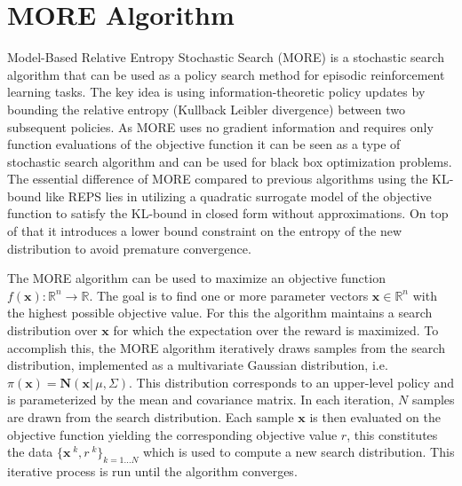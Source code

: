 \section{MORE Algorithm}
\label{sec:more}
Model-Based Relative Entropy Stochastic Search
(MORE) \citep{abdolmaleki2015model} is a
stochastic search algorithm that can be used
as a policy search method for episodic reinforcement
learning tasks. The key idea is
using information-theoretic policy updates
by bounding the relative entropy (Kullback Leibler divergence)
between two subsequent policies.
As MORE uses no gradient information and requires only function evaluations
of the objective function it can be seen as
a type of stochastic search algorithm and can be used
for black box optimization problems.
The essential difference of MORE compared to previous algorithms using
the KL-bound like REPS \citep{peters2010relative} lies in utilizing
a quadratic surrogate model of the objective function
to  satisfy the KL-bound in closed form without approximations.
On top of that it
introduces a lower bound constraint on the entropy of the new distribution
to avoid premature convergence.

The MORE algorithm can be used to maximize an objective function
$f(\mathbf{x}): \mathbb{R}^n \rightarrow \mathbb{R}$. The goal is
to find one or more parameter vectors $\mathbf{x} \in \mathbb{R}^n$ with the
highest possible objective value. For this the algorithm maintains
a search distribution over $\mathbf{x}$ for which the
expectation over the reward is maximized. To accomplish this, the
MORE algorithm iteratively draws samples from the search
distribution, implemented
as a multivariate Gaussian distribution, i.e.
$\pi(\mathbf{x}) = \mathbf{N}(\mathbf{x} |\, \mu, \Sigma)$.
This distribution corresponds to an upper-level policy
and is parameterized by the mean and covariance matrix.
In each iteration, $N$ samples are drawn from the
search distribution. Each sample $\mathbf{x}$ is then
evaluated on the objective function yielding the corresponding
objective value $r$, this constitutes the data
$\{\mathbf{x}^{\;k}, r^{\;k}\}_{k=1...N}$ which is
used to compute a new search distribution.
This iterative process is run until the algorithm converges.


